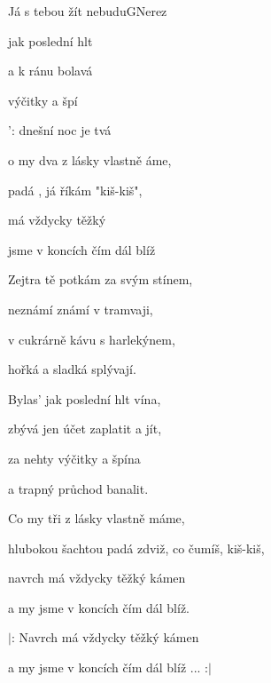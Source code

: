 \begin{song}{Já s tebou žít nebudu}{G}{Nerez}

\begin{SBVerse}

 jak poslední hlt 

 a k ránu bolavá

 výčitky a špí

': dnešní noc je tvá

\end{SBVerse}

\begin{SBChorus}

o my dva z lásky vlastně áme,

  padá , já říkám "kiš-kiš",

 má vždycky těžký 

 jsme v koncích čím dál blíž

\end{SBChorus}

\begin{SBVerse}

Zejtra tě potkám za svým stínem,

neznámí známí v tramvaji,

v cukrárně kávu s harlekýnem,

hořká a sladká splývají.

\end{SBVerse}

\begin{SBChorus}

\end{SBChorus}

\begin{SBVerse}

Bylas' jak poslední hlt vína,

zbývá jen účet zaplatit a jít,

za nehty výčitky a špína

a trapný průchod banalit.

\end{SBVerse}

\begin{SBChorus}

Co my tři z lásky vlastně máme,

hlubokou šachtou padá zdviž, co čumíš, kiš-kiš,

navrch má vždycky těžký kámen

a my jsme v koncích čím dál blíž.

\end{SBChorus}

\begin{SBChorus*}

$|$: Navrch má vždycky těžký kámen

a my jsme v koncích čím dál blíž ... :$|$

\end{SBChorus*}

\end{song}

\clearpage
